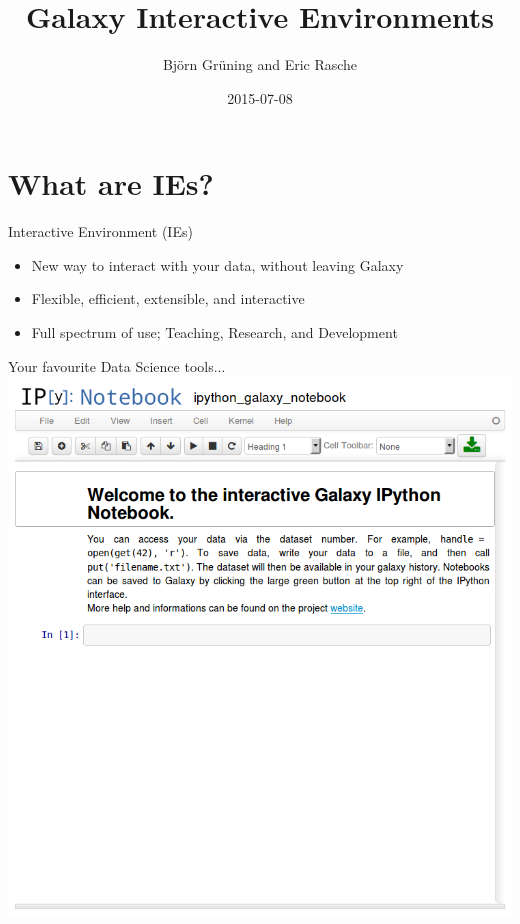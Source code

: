 \documentclass[12pt]{beamer} %
\title[Interactive Environments]{Galaxy Interactive Environments}
\author[BG \& ER]{Bj\"orn Gr\"uning and Eric Rasche}
\date{2015-07-08}
\begin{document}
\frame{\titlepage}

\section{What are IEs?}
\begin{frame}{Interactive Environment (IEs)}
	\begin{itemize}
    	\item New way to interact with your data, without leaving Galaxy
        \item Flexible, efficient, extensible, and interactive
        \item Full spectrum of use; Teaching, Research, and Development 
    \end{itemize}
\end{frame}

\begin{frame}{Your favourite Data Science tools...}
    \includegraphics[width=\textwidth]{./ipy-nogx.png}
\end{frame}
\end{document}
